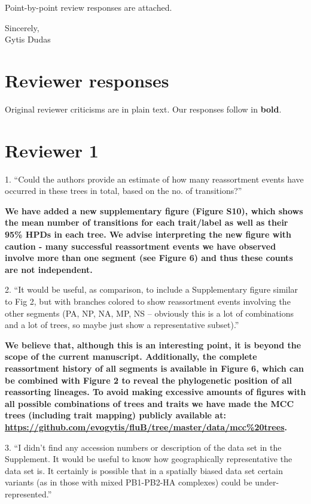 \documentclass[11pt,oneside,letterpaper]{article}
\begin{document}
Point-by-point review responses are attached.

Sincerely,\\
Gytis Dudas

\restoregeometry

\newpage

\section*{Reviewer responses}

Original reviewer criticisms are in plain text.  Our responses follow in \textbf{bold}.  

\section*{Reviewer 1}
1. ``Could the authors provide an estimate of how many reassortment events have occurred in these trees in total, based on the no. of transitions?''

\textbf{We have added a new supplementary figure (Figure S10), which shows the mean number of transitions for each trait/label as well as their 95\% HPDs in each tree.
We advise interpreting the new figure with caution - many successful reassortment events we have observed involve more than one segment (see Figure 6) and thus these counts are not independent.}

2. ``It would be useful, as comparison, to include a Supplementary figure similar to Fig 2, but with branches colored to show reassortment events involving the other segments (PA, NP, NA, MP, NS -- obviously this is a lot of combinations and a lot of trees, so maybe just show a representative subset).''

\textbf{We believe that, although this is an interesting point, it is beyond the scope of the current manuscript.
Additionally, the complete reassortment history of all segments is available in Figure 6, which can be combined with Figure 2 to reveal the phylogenetic position of all reassorting lineages.
To avoid making excessive amounts of figures with all possible combinations of trees and traits we have made the MCC trees (including trait mapping) publicly available at: \url{https://github.com/evogytis/fluB/tree/master/data/mcc\%20trees}.}

3. ``I didn't find any accession numbers or description of the data set in the Supplement.  
It would be useful to know how geographically representative the data set is.  
It certainly is possible that in a spatially biased data set certain variants (as in those with mixed PB1-PB2-HA complexes) could be under-represented.''
\end{document}
